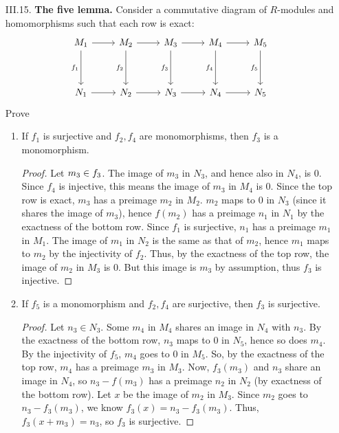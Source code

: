 \documentclass[10pt]{article}
\let\ker\relax
\DeclareMathOperator*{\ker}{Ker}
\begin{document}
\begin{enumerate}
\item[III.15.]\textbf{The five lemma.} Consider a commutative diagram of $R$-modules and homomorphisms such that each row is exact:
$$
\begin{tikzcd}
M_1 \arrow[r] \arrow[dd,"f_1"'] & M_2 \arrow[r] \arrow[dd,"f_2"'] & M_3 \arrow[r] \arrow[dd,"f_3"'] & M_4 \arrow[r] \arrow[dd,"f_4"'] & M_5 \arrow[dd,"f_5"'] \\ \\
N_1 \arrow[r] & N_2 \arrow[r] & N_3 \arrow[r] & N_4 \arrow[r] & N_5
\end{tikzcd}
$$
Prove
\begin{enumerate}
\item If $f_1$ is surjective and $f_2,f_4$ are monomorphisms, then $f_3$ is a monomorphism.

\begin{proof}

Let $m_3 \in \ker f_3$.  The image of $m_3$ in $N_3$, and hence also in $N_4$, is 0.  Since $f_4$ is injective, this means the image of $m_3$ in $M_4$ is $0$.  Since the top row is exact, $m_3$ has a preimage $m_2$ in $M_2$.  $m_2$ maps to $0$ in $N_3$ (since it shares the image of $m_3$), hence $f(m_2)$ has a preimage $n_1$ in $N_1$ by the exactness of the bottom row.  Since $f_1$ is surjective, $n_1$ has a preimage $m_1$ in $M_1$.  The image of $m_1$ in $N_2$ is the same as that of $m_2$, hence $m_1$ maps to $m_2$ by the injectivity of $f_2$.  Thus, by the exactness of the top row, the image of $m_2$ in $M_3$ is $0$.  But this image is $m_3$ by assumption, thus $f_3$ is injective.

\end{proof}

\item If $f_5$ is a monomorphism and $f_2,f_4$ are surjective, then $f_3$ is surjective.

\begin{proof}

Let $n_3 \in N_3$.  Some $m_4$ in $M_4$ shares an image in $N_4$ with $n_3$.  By the exactness of the bottom row, $n_3$ maps to $0$ in $N_5$, hence so does $m_4$.  By the injectivity of $f_5$, $m_4$ goes to $0$ in $M_5$.  So, by the exactness of the top row, $m_4$ has a preimage $m_3$ in $M_3$.  Now, $f_3(m_3)$ and $n_3$ share an image in $N_4$, so $n_3 - f(m_3)$ has a preimage $n_2$ in $N_2$ (by exactness of the bottom row).  Let $x$ be the image of $m_2$ in $M_3$.  Since $m_2$ goes to $n_3 - f_3(m_3)$, we know $f_3(x) = n_3 - f_3(m_3)$.  Thus, $f_3(x + m_3) = n_3$, so $f_3$ is surjective.


\end{proof}
\end{enumerate}
\end{enumerate}
\end{document}

